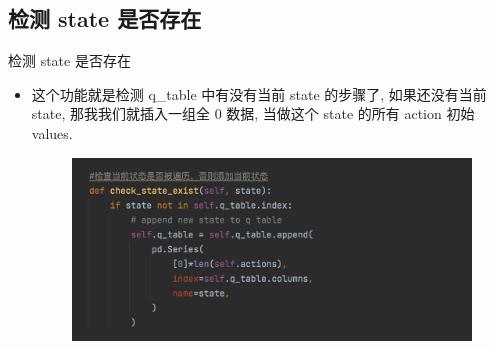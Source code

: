 \documentclass{beamer}
\begin{document}
\subsection{检测 state 是否存在 }
\begin{frame}{检测 state 是否存在}
    \begin{itemize}
    \tiny
    
    \item 这个功能就是检测 q\_table 中有没有当前 state 的步骤了, 如果还没有当前 state, 那我我们就插入一组全 0 数据, 当做这个 state 的所有 action 初始 values.
    \\
    
    \begin{minipage}{0.5\linewidth}
        \medskip
        \begin{figure}[h]
            \centering
            \includegraphics[height=.4\textheight]{pic/10.png}
        \end{figure}
    \end{minipage}
    \end{itemize}
\end{frame}
\end{document}
